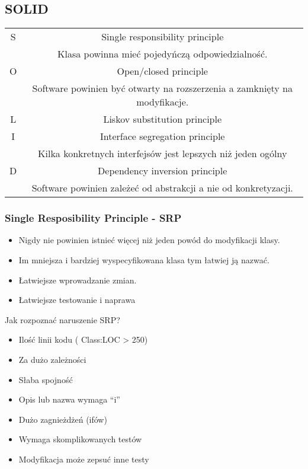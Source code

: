 \documentclass[a4paper]{article}
\begin{document}
    \subsection{SOLID}


    \begin{tabular}{|c|c|}
        \hline
        S & Single responsibility principle\\
        & Klasa powinna mieć pojedyńczą
        odpowiedzialność.\\
        \hline
        O & Open/closed principle\\
        & Software powinien być otwarty na
        rozszerzenia a zamknięty na modyfikacje.\\
        \hline
        L & Liskov substitution principle\\
        \hline
        I & Interface segregation principle\\
        & Kilka konkretnych interfejsów jest lepszych
        niż jeden ogólny\\
        \hline
        D & Dependency inversion principle\\
        & Software powinien zależeć od abstrakcji a
        nie od konkretyzacji.\\
        \hline
    \end{tabular}

    \subsubsection{Single Resposibility Principle - SRP}
    \begin{itemize}
        \item Nigdy nie powinien istnieć więcej niż jeden powód do modyfikacji klasy.
        \item Im mniejsza i bardziej wyspecyfikowana klasa tym łatwiej ją nazwać.
        \item Łatwiejsze wprowadzanie zmian.
        \item Łatwiejsze testowanie i naprawa
    \end{itemize}

    Jak rozpoznać naruszenie SRP?
    \begin{itemize}
        \item Ilość linii kodu ( Class:LOC > 250)
        \item Za dużo
        zależności
        \item Słaba spojność
        \item Opis lub nazwa wymaga “i”
        \item Dużo zagnieżdżeń (ifów)
        \item Wymaga skomplikowanych testów
        \item Modyfikacja może zepsuć inne testy
    \end{itemize}
\end{document}
